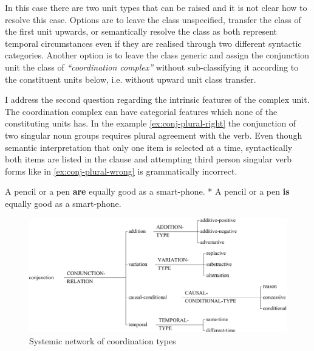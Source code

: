 In this case there are two unit types that can be raised and it is not clear how to resolve this case. Options are to leave the class unspecified, transfer the class of the first unit upwards, or semantically resolve the class as both represent temporal circumstances even if they are realised through two different syntactic categories. Another option is to leave the class generic and assign the conjunction unit the class of \textit{``coordination complex''} without sub-classifying it according to the constituent units below, i.e. without upward unit class transfer. 

I address the second question regarding the intrinsic features of the complex unit. The coordination complex can have categorial features which none of the constituting units has. In the example \ref{ex:conj-plural-right} the conjunction of two singular noun groups requires plural agreement with the verb. Even though semantic interpretation that only one item is selected at a time, syntactically both items are listed in the clause and attempting third person singular verb forms like in \ref{ex:conj-plural-wrong} is grammatically incorrect.
\begin{exe}
	\ex\label{ex:conj-plural-right}
	A pencil or a pen \textbf{are} equally good as a smart-phone.
	\ex\label{ex:conj-plural-wrong} * A pencil or a pen \textbf{is} equally good as a smart-phone.
\end{exe}
\begin{figure}[hbtp]
	\centering
	\includegraphics[width=\textwidth]{Figures/SFL-grammar/conjunction-system.pdf}
	\caption{Systemic network of coordination types}
	\label{fig:conj-rel-types}
\end{figure}

